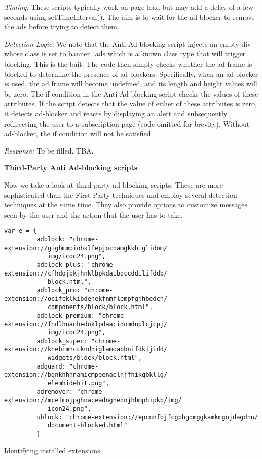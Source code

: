 \documentclass[runningheads,a4paper]{llncs}
\begin{document}
\textit{Timing:} These scripts typically work on page load but may add a delay of a few seconds using setTimeInterval(). The aim is to wait for the ad-blocker to remove the ads before trying to detect them.

\textit{Detection Logic:} We note that the Anti Ad-blocking script injects an empty div whose class is set to banner\_ads which is a known class type that will trigger blocking. This is the bait. The code then simply checks whether the ad frame is blocked to determine the presence of ad-blockers. Specifically, when an ad-blocker is used, the ad frame will become undefined, and its length and height values will be zero. The if condition in the Anti Ad-blocking script checks the values of these attributes. If the script detects that the value of either of these attributes is zero, it detects ad-blocker and reacts by displaying an alert and subsequently redirecting the user to a subscription page (code omitted for brevity). Without ad-blocker, the if condition will not be satisfied.

\textit{Response:} To be filled. TBA.


\textbf{Third-Party Anti Ad-blocking scripts}

Now we take a look at third-party ad-blocking scripts. These are more sophisticated than the First-Party techniques and employ several detection techniques at the same time. They also provide options to customize messages seen by the user and the action that the user has to take.

\begin{listing}[!ht]
\begin{verbatim}
var e = {
         adblock: "chrome-extension://gighmmpiobklfepjocnamgkkbiglidom/
         	img/icon24.png",
         adblock_plus: "chrome-extension://cfhdojbkjhnklbpkdaibdccddilifddb/
         	block.html",
         adblock_pro: "chrome-extension://ocifcklkibdehekfnmflempfgjhbedch/
         	components/block/block.html",
         adblock_premium: "chrome-extension://fndlhnanhedoklpdaacidomdnplcjcpj/
         	img/icon24.png",
         adblock_super: "chrome-extension://knebimhcckndhiglamoabbnifdkijidd/
         	widgets/block/block.html",
         adguard: "chrome-extension://bgnkhhnnamicmpeenaelnjfhikgbkllg/
         	elemhidehit.png",
         adremover: "chrome-extension://mcefmojpghnaceadnghednjhbmphipkb/img/
         	icon24.png",
         ublock: "chrome-extension://epcnnfbjfcgphgdmggkamkmgojdagdnn/
         	document-blocked.html"
         }

\end{verbatim}
\caption{Identifying installed extensions}
\label{listing:extensions}
\end{listing}
            
\end{document}
